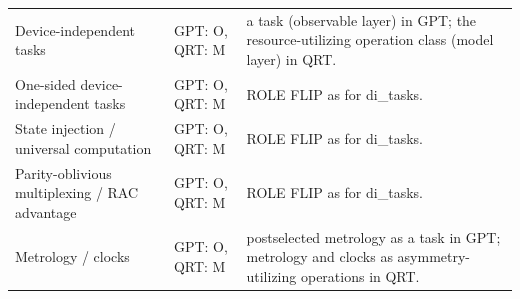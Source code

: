 \begin{longtable}{@{}p{3.2cm}p{3.0cm}p{8.4cm}@{}}
Device-independent tasks & GPT: O, QRT: M & a task (observable layer) in GPT; the resource-utilizing operation class (model layer) in QRT. \\
One-sided device-independent tasks & GPT: O, QRT: M & ROLE FLIP as for di\_tasks. \\
State injection / universal computation & GPT: O, QRT: M & ROLE FLIP as for di\_tasks. \\
Parity-oblivious multiplexing / RAC advantage & GPT: O, QRT: M & ROLE FLIP as for di\_tasks. \\
Metrology / clocks & GPT: O, QRT: M & postselected metrology as a task in GPT; metrology and clocks as asymmetry-utilizing operations in QRT. \\
\bottomrule\end{longtable}
